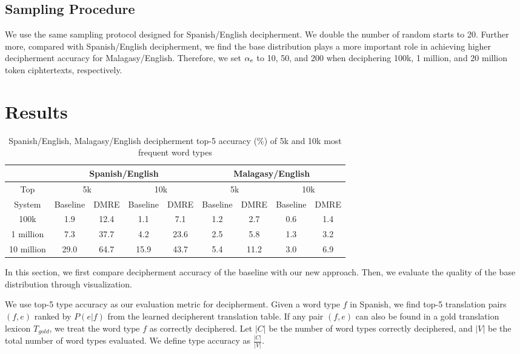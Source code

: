 \subsection{Sampling Procedure}

We use the same sampling protocol designed for Spanish/English decipherment. We double the number of random starts to 20. Further more, compared with Spanish/English decipherment, we find the base distribution plays a more important role in achieving higher decipherment accuracy for Malagasy/English. Therefore, we set $\alpha_{e}$ to 10, 50, and 200 when deciphering 100k, 1 million, and 20 million token ciphtertexts, respectively.


\section{Results}

%
 \begin{table}[!ht]
 \begin{center}
 \begin{tabular}{ |c|c|c|c|c|c|c|c|c| } \hline
         & \multicolumn{4}{|c|}{Spanish/English} & \multicolumn{4}{|c|}{Malagasy/English} \\ \hline
 Top &  \multicolumn{2}{|c|}{5k} & \multicolumn{2}{|c|}{10k} & \multicolumn{2}{|c|}{5k} & \multicolumn{2}{|c|}{10k} \\ \hline
 System &  Baseline & DMRE & Baseline & DMRE &  Baseline & DMRE & Baseline & DMRE \\ \hline
 100k &  1.9 & 12.4 & 1.1 & 7.1 &  1.2 & 2.7 & 0.6 & 1.4 \\ \hline
 1 million &  7.3 & 37.7& 4.2 & 23.6 &  2.5 & 5.8 & 1.3 & 3.2 \\ \hline
 10 million &  29.0 & 64.7 & 15.9 & 43.7 &  5.4 & 11.2 & 3.0 & 6.9 \\ \hline
 \end{tabular}
 \caption{Spanish/English, Malagasy/English decipherment top-5 accuracy (\%) of 5k and 10k most frequent word types}
 \label{decipher-acc-result}
 \end{center}
 \end{table}
%

In this section, we first compare decipherment accuracy of the baseline with our new approach. Then, we evaluate the quality of the base distribution through visualization.

We use top-5 type accuracy as our evaluation metric for decipherment. Given a word type $f$ in Spanish, we find top-5 translation pairs $(f,e)$ ranked by $P(e|f)$ from the learned decipherent translation table. If any pair $(f,e)$ can also be found in a gold translation lexicon $T_{gold}$, we treat the word type $f$ as correctly deciphered. Let $|C|$ be the number of word types correctly deciphered, and $|V|$ be the total number of word types evaluated. We define type accuracy as $\frac{|C|}{|V|}$.

